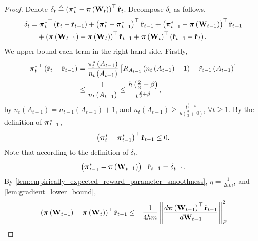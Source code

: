 \begin{proof}
    Denote $\delta_t \triangleq \left( {{\boldsymbol{\pi}}_t^*} - {\boldsymbol{\pi}}\left( {\mathbf{W}}_t \right) \right)^\top \hat{{\mathbf{r}}}_t$. Decompose $\delta_t$ as follows,
\begin{equation}
\label{eq:dynamic_regret_decomposition}
\begin{split}
    \delta_t &= {{\boldsymbol{\pi}}_t^*}^\top \left( \hat{{\mathbf{r}}}_t - \hat{{\mathbf{r}}}_{t-1}\right) + \left( {{\boldsymbol{\pi}}_t^*} - {{\boldsymbol{\pi}}_{t-1}^*} \right)^\top \hat{{\mathbf{r}}}_{t-1}  + \left( {{\boldsymbol{\pi}}_{t-1}^*} - {\boldsymbol{\pi}}\left( {\mathbf{W}}_{t-1} \right) \right)^\top \hat{{\mathbf{r}}}_{t-1} \\
    &\quad + \left(  {\boldsymbol{\pi}}\left( {\mathbf{W}}_{t-1} \right) - {\boldsymbol{\pi}}\left( {\mathbf{W}}_t \right) 
    \right)^\top \hat{{\mathbf{r}}}_{t-1} + {\boldsymbol{\pi}}\left( {\mathbf{W}}_t \right)^\top \left( \hat{{\mathbf{r}}}_{t-1} - \hat{{\mathbf{r}}}_t \right).
\end{split}
\end{equation}
We upper bound each term in the right hand side. Firstly,
\begin{equation*}
\begin{split}
    {{\boldsymbol{\pi}}_t^*}^\top \left( \hat{{\mathbf{r}}}_t - \hat{{\mathbf{r}}}_{t-1}\right) &= \frac{\pi_{t}^*\left(A_{t-1}\right)}{n_{t}\left(A_{t-1}\right)} \left[ R_{ A_{t-1}}\left( n_{t}\left(A_{t-1}\right) -1 \right) - \hat{r}_{t-1}\left(A_{t-1}\right) \right] \\
    &\le \frac{1}{n_{t}\left(A_{t-1}\right)} \le \frac{ h \left(\frac{2}{3} + \beta \right)  }{t^{\frac{2}{3} + \beta}},
\end{split}
\end{equation*}
by $n_{t}\left(A_{t-1}\right) = n_{t-1}\left(A_{t-1}\right) + 1$, and $n_{t}\left(A_{t-1}\right) \ge \frac{t^{\frac{2}{3} + \beta}}{ h  \left(\frac{2}{3} + \beta \right) }$, $\forall t \ge 1$. By the definition of ${{\boldsymbol{\pi}}_{t-1}^*}$,
\begin{equation*}
    \left( {{\boldsymbol{\pi}}_t^*} - {{\boldsymbol{\pi}}_{t-1}^*} \right)^\top \hat{{\mathbf{r}}}_{t-1} \le 0.
\end{equation*}
Note that according to the definition of $\delta_t$,
\begin{equation*}
    \left( {{\boldsymbol{\pi}}_{t-1}^*} - {\boldsymbol{\pi}}\left( {\mathbf{W}}_{t-1} \right) \right)^\top \hat{{\mathbf{r}}}_{t-1} = \delta_{t-1}.
\end{equation*}
By \cref{lem:empirically_expected_reward_parameter_smoothness}, $\eta = \frac{1}{2 h m}$, and \cref{lem:gradient_lower_bound},
\begin{equation*}
\begin{split}
    &\left( \rvpi\left( \rmW_{t-1} \right) - \rvpi\left( \rmW_t \right) \right)^\top \hat{\rvr}_{t-1} \le - \frac{1}{4 h m} \left\| \frac{d \rvpi\left( \rmW_{t-1} \right)^\top \hat{\rvr}_{t-1}}{d \rmW_{t-1}} \right\|_F^2 \\

\end{split}
\end{equation*}
\end{proof}
